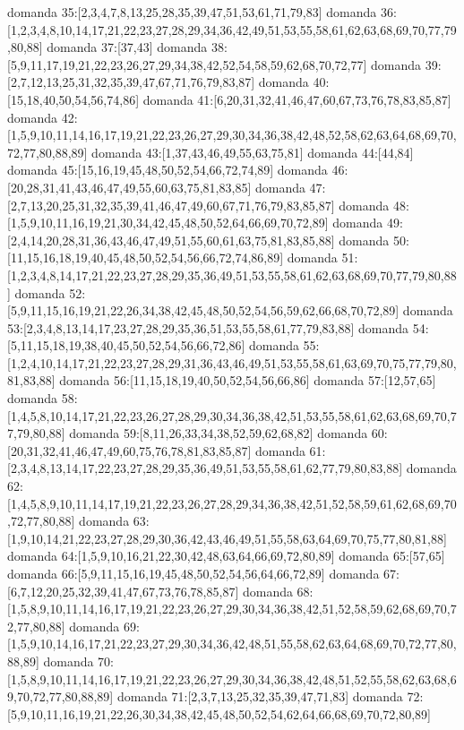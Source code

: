 domanda 35:[2,3,4,7,8,13,25,28,35,39,47,51,53,61,71,79,83]
domanda 36:[1,2,3,4,8,10,14,17,21,22,23,27,28,29,34,36,42,49,51,53,55,58,61,62,63,68,69,70,77,79,80,88]
domanda 37:[37,43]
domanda 38:[5,9,11,17,19,21,22,23,26,27,29,34,38,42,52,54,58,59,62,68,70,72,77]
domanda 39:[2,7,12,13,25,31,32,35,39,47,67,71,76,79,83,87]
domanda 40:[15,18,40,50,54,56,74,86]
domanda 41:[6,20,31,32,41,46,47,60,67,73,76,78,83,85,87]
domanda 42:[1,5,9,10,11,14,16,17,19,21,22,23,26,27,29,30,34,36,38,42,48,52,58,62,63,64,68,69,70,72,77,80,88,89]
domanda 43:[1,37,43,46,49,55,63,75,81]
domanda 44:[44,84]
domanda 45:[15,16,19,45,48,50,52,54,66,72,74,89]
domanda 46:[20,28,31,41,43,46,47,49,55,60,63,75,81,83,85]
domanda 47:[2,7,13,20,25,31,32,35,39,41,46,47,49,60,67,71,76,79,83,85,87]
domanda 48:[1,5,9,10,11,16,19,21,30,34,42,45,48,50,52,64,66,69,70,72,89]
domanda 49:[2,4,14,20,28,31,36,43,46,47,49,51,55,60,61,63,75,81,83,85,88]
domanda 50:[11,15,16,18,19,40,45,48,50,52,54,56,66,72,74,86,89]
domanda 51:[1,2,3,4,8,14,17,21,22,23,27,28,29,35,36,49,51,53,55,58,61,62,63,68,69,70,77,79,80,88]
domanda 52:[5,9,11,15,16,19,21,22,26,34,38,42,45,48,50,52,54,56,59,62,66,68,70,72,89]
domanda 53:[2,3,4,8,13,14,17,23,27,28,29,35,36,51,53,55,58,61,77,79,83,88]
domanda 54:[5,11,15,18,19,38,40,45,50,52,54,56,66,72,86]
domanda 55:[1,2,4,10,14,17,21,22,23,27,28,29,31,36,43,46,49,51,53,55,58,61,63,69,70,75,77,79,80,81,83,88]
domanda 56:[11,15,18,19,40,50,52,54,56,66,86]
domanda 57:[12,57,65]
domanda 58:[1,4,5,8,10,14,17,21,22,23,26,27,28,29,30,34,36,38,42,51,53,55,58,61,62,63,68,69,70,77,79,80,88]
domanda 59:[8,11,26,33,34,38,52,59,62,68,82]
domanda 60:[20,31,32,41,46,47,49,60,75,76,78,81,83,85,87]
domanda 61:[2,3,4,8,13,14,17,22,23,27,28,29,35,36,49,51,53,55,58,61,62,77,79,80,83,88]
domanda 62:[1,4,5,8,9,10,11,14,17,19,21,22,23,26,27,28,29,34,36,38,42,51,52,58,59,61,62,68,69,70,72,77,80,88]
domanda 63:[1,9,10,14,21,22,23,27,28,29,30,36,42,43,46,49,51,55,58,63,64,69,70,75,77,80,81,88]
domanda 64:[1,5,9,10,16,21,22,30,42,48,63,64,66,69,72,80,89]
domanda 65:[57,65]
domanda 66:[5,9,11,15,16,19,45,48,50,52,54,56,64,66,72,89]
domanda 67:[6,7,12,20,25,32,39,41,47,67,73,76,78,85,87]
domanda 68:[1,5,8,9,10,11,14,16,17,19,21,22,23,26,27,29,30,34,36,38,42,51,52,58,59,62,68,69,70,72,77,80,88]
domanda 69:[1,5,9,10,14,16,17,21,22,23,27,29,30,34,36,42,48,51,55,58,62,63,64,68,69,70,72,77,80,88,89]
domanda 70:[1,5,8,9,10,11,14,16,17,19,21,22,23,26,27,29,30,34,36,38,42,48,51,52,55,58,62,63,68,69,70,72,77,80,88,89]
domanda 71:[2,3,7,13,25,32,35,39,47,71,83]
domanda 72:[5,9,10,11,16,19,21,22,26,30,34,38,42,45,48,50,52,54,62,64,66,68,69,70,72,80,89]
